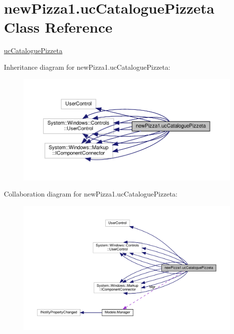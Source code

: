 \hypertarget{classnewPizza1_1_1ucCataloguePizzeta}{}\section{new\+Pizza1.\+uc\+Catalogue\+Pizzeta Class Reference}
\label{classnewPizza1_1_1ucCataloguePizzeta}


\hyperlink{classnewPizza1_1_1ucCataloguePizzeta}{uc\+Catalogue\+Pizzeta}  




Inheritance diagram for new\+Pizza1.\+uc\+Catalogue\+Pizzeta\+:
\nopagebreak
\begin{figure}[H]
\begin{center}
\leavevmode
\includegraphics[width=350pt]{classnewPizza1_1_1ucCataloguePizzeta__inherit__graph}
\end{center}
\end{figure}


Collaboration diagram for new\+Pizza1.\+uc\+Catalogue\+Pizzeta\+:
\nopagebreak
\begin{figure}[H]
\begin{center}
\leavevmode
\includegraphics[width=350pt]{classnewPizza1_1_1ucCataloguePizzeta__coll__graph}
\end{center}
\end{figure}
